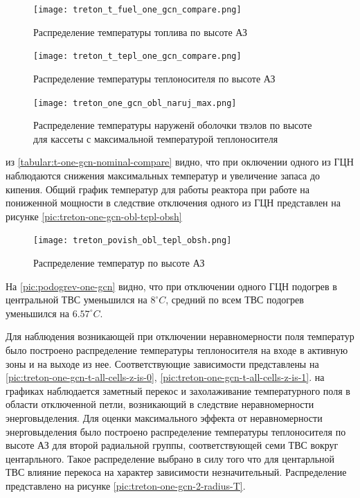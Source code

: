 \begin{figure}[H]
	\begin{center}
		\texttt{[image: treton\_t\_fuel\_one\_gcn\_compare.png]}
		\caption{Распределение температуры топлива по высоте АЗ}
		\label{pic:treton-t-fuel-one-gcn-compare} %
	\end{center}
\end{figure}

\begin{figure}[H]
	\begin{center}
		\texttt{[image: treton\_t\_tepl\_one\_gcn\_compare.png]}
		\caption{Распределение температуры теплоносителя по высоте АЗ}
		\label{pic:treton-t-tepl-one-gcn-compare} %
	\end{center}
\end{figure}

\begin{figure}[H]
	\begin{center}
		\texttt{[image: treton\_one\_gcn\_obl\_naruj\_max.png]}
		\caption{Распределение температуры наруженй оболочки твэлов по высоте для кассеты с максимальной температурой теплоносителя}
		\label{pic:treton-one-gcn-obl-naruj-max} %
	\end{center}
\end{figure}

из \ref{tabular:t-one-gcn-nominal-compare} видно, что при оключении одного из ГЦН наблюдаются снижения максимальных температур и увеличение запаса до кипения. Общий график температур для работы реактора при работе на пониженной мощности в следствие отключения одного из ГЦН представлен на рисунке \ref{pic:treton-one-gcn-obl-tepl-obsh}

\begin{figure}[H]
	\begin{center}
		\texttt{[image: treton\_povish\_obl\_tepl\_obsh.png]}
		\caption{Распределение температур по высоте АЗ}
		\label{pic:treton-povish-obl-tepl-obsh} %
	\end{center}
\end{figure}
На \ref{pic:podogrev-one-gcn} видно, что при отключении одного ГЦН подогрев в центральной ТВС уменьшился на $8 ^\circ C$, средний по всем ТВС подогрев уменьшился на $6.57 ^\circ C$. 

Для наблюдения возникающей при отключении неравномерности поля температур было построено распределение температуры теплоносителя на входе в активную зоны и на выходе из нее. Соответствующие зависимости представлены на \ref{pic:treton-one-gcn-t-all-cells-z-is-0}, \ref{pic:treton-one-gcn-t-all-cells-z-is-1}. на графиках наблюдается заметный перекос и захолаживание температурного поля в области отключенной петли, возникающий в следствие неравномерности энерговыделения. Для оценки максимального эффекта от неравномерности энерговыделения было построено распределение температуры теплоносителя по высоте АЗ для второй радиальной группы, соответствующей семи ТВС вокруг центарльного. Такое распределение выбрано в силу того что для центарльной ТВС влияние перекоса на характер зависимости незначительный. Распределение представлено на рисунке \ref{pic:treton-one-gcn-2-radius-T}.

